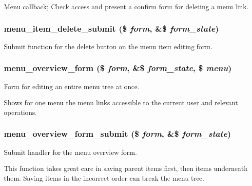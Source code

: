 \label{menu_8admin_8inc_a2aaea348b520cd9c44792983f1749cfa}
Menu callback; Check access and present a confirm form for deleting a menu link. \hypertarget{menu_8admin_8inc_aa0ab9f4cce0d1ece6c2151ad212e81f9}{
\subsubsection[{menu\_\-item\_\-delete\_\-submit}]{\setlength{\rightskip}{0pt plus 5cm}menu\_\-item\_\-delete\_\-submit (\$ {\em form}, \/  \&\$ {\em form\_\-state})}}
\label{menu_8admin_8inc_aa0ab9f4cce0d1ece6c2151ad212e81f9}
Submit function for the delete button on the menu item editing form. \hypertarget{menu_8admin_8inc_a460cda2f4e09b8281c8c9e01bf65360b}{
\subsubsection[{menu\_\-overview\_\-form}]{\setlength{\rightskip}{0pt plus 5cm}menu\_\-overview\_\-form (\$ {\em form}, \/  \&\$ {\em form\_\-state}, \/  \$ {\em menu})}}
\label{menu_8admin_8inc_a460cda2f4e09b8281c8c9e01bf65360b}
Form for editing an entire menu tree at once.

Shows for one menu the menu links accessible to the current user and relevant operations. \hypertarget{menu_8admin_8inc_aa16576d9e19529ee9f710dc3b5f5b810}{
\subsubsection[{menu\_\-overview\_\-form\_\-submit}]{\setlength{\rightskip}{0pt plus 5cm}menu\_\-overview\_\-form\_\-submit (\$ {\em form}, \/  \&\$ {\em form\_\-state})}}
\label{menu_8admin_8inc_aa16576d9e19529ee9f710dc3b5f5b810}
Submit handler for the menu overview form.

This function takes great care in saving parent items first, then items underneath them. Saving items in the incorrect order can break the menu tree.

